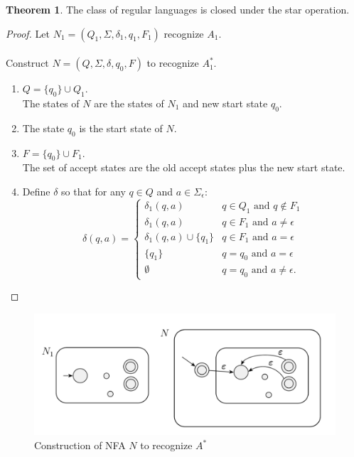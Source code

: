 \documentclass[11pt]{article}
\theoremstyle{definition}
\newtheorem{thm}{Theorem}[section]
\begin{document}
\begin{thm}
The class of regular languages is closed under the star operation.
\end{thm}
\begin{proof}
    Let $N_1 = (Q_1, \Sigma, \delta_1, q_1, F_1)$ recognize $A_1$.\\\\
    Construct $N = (Q, \Sigma, \delta, q_0, F)$ to recognize $A_1^*$.
    \begin{enumerate}
        \item $Q = \{q_0\}\cup Q_1$.\\
        The states of $N$ are the states of $N_1$ and new start state $q_0$.
        \item The state $q_0$ is the start state of $N$.
        \item $F = \{q_0\}\cup F_1$.\\
        The set of accept states are the old accept states plus the new start state.
        \item Define $\delta$ so that for any $q\in Q$ and $a\in \Sigma_\epsilon$:
        \begin{equation*}
            \delta(q,a) = \begin{cases}
               \delta_1(q,a)               & q\in Q_1 \text{ and } q\notin F_1\\
               \delta_1(q,a)               & q\in F_1 \text{ and } a\neq\epsilon\\
               \delta_1(q,a)\cup\{q_1\}    & q\in F_1 \text{ and } a=\epsilon\\
                \{q_1\}               & q = q_0 \text{ and } a=\epsilon\\
               \emptyset               & q = q_0 \text{ and } a\neq\epsilon.
           \end{cases}
        \end{equation*}
    \end{enumerate}   
\end{proof}
\begin{figure}[h]
	\centering
	\includegraphics[width=0.5\linewidth]{nfa_star.png}
	\caption{Construction of NFA $N$ to recognize $A^*$}
	\label{fig}
\end{figure}
\end{document}
